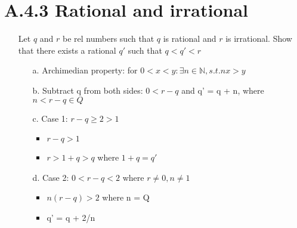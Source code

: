 \documentclass[12pt]{article}
\begin{document}
\section*{A.4.3 Rational and irrational}
\begin{enumerate}
  \item[] Let $q$ and $r$ be rel numbers such that $q$ is rational and $r$ is irrational. Show that there exists a rational ${q'}$ such that ${q < q' < r}$
    \begin{enumerate}
      \item[a.] Archimedian property: for ${0 < x < y : \exists n \in \mathbb{N}, s.t.  nx > y}$ 
      \item[b.] Subtract q from both sides: ${0 < r-q}$ and q' = q + n, where ${n < r-q \in Q}$
      \item[c.] Case 1: ${r-q \geq 2 > 1}$
        \begin{itemize} 
          \item ${r-q > 1}$
          \item ${r > 1 + q > q}$ where ${1 + q = q'}$
        \end{itemize}
      \item[d.] Case 2: ${0 < r - q < 2}$ where ${r \neq 0, n \neq 1}$
        \begin{itemize}
          \item ${n(r-q) > 2}$ where n = Q
          \item q' = q + 2/n
        \end{itemize}
    \end{enumerate}
\end{enumerate}
\end{document}
